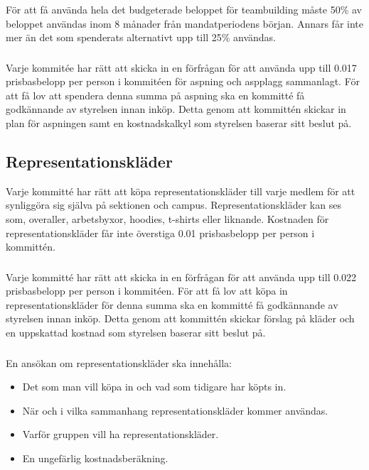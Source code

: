 \documentclass[a4paper, 10pt]{article}
\begin{document}
\subsubsection{}
För att få använda hela det budgeterade beloppet för teambuilding måste 50\% av beloppet användas inom 8 månader från mandatperiodens början. Annars får inte mer än det som spenderats alternativt upp till 25\% användas.

\subsubsection{}
Varje kommitée har rätt att skicka in en förfrågan för att använda upp till
0.017 prisbasbelopp per person i kommitéen för aspning och aspplagg sammanlagt. För att
få lov att spendera denna summa på aspning ska en kommitté få godkännande av
styrelsen innan inköp. Detta genom att kommittén skickar in plan för aspningen samt
en kostnadskalkyl som styrelsen baserar sitt beslut på.


\subsection{Representationskläder}
Varje kommitté har rätt att köpa representationskläder till varje medlem 
för att synliggöra sig själva på sektionen och campus. Representationskläder 
kan ses som, overaller, arbetsbyxor, hoodies, t-shirts eller liknande.
Kostnaden för representationskläder får inte överstiga 0.01 prisbasbelopp 
per person i kommittén.

\subsubsection{}
Varje kommitté har rätt att skicka in en förfrågan för att använda upp
till 0.022 prisbasbelopp per person i kommitéen. För att få lov att köpa 
in representationskläder för denna summa ska en kommitté få godkännande 
av styrelsen innan inköp. Detta genom att kommittén skickar förslag på 
kläder och en uppskattad kostnad som styrelsen baserar sitt beslut på.

\subsubsection{}
En ansökan om representationskläder ska innehålla:
\begin{itemize}
  \item Det som man vill köpa in och vad som tidigare har köpts in.
  \item När och i vilka sammanhang representationskläder kommer användas.
  \item Varför gruppen vill ha representationskläder.
  \item En ungefärlig kostnadsberäkning.
\end{itemize}
\end{document}
